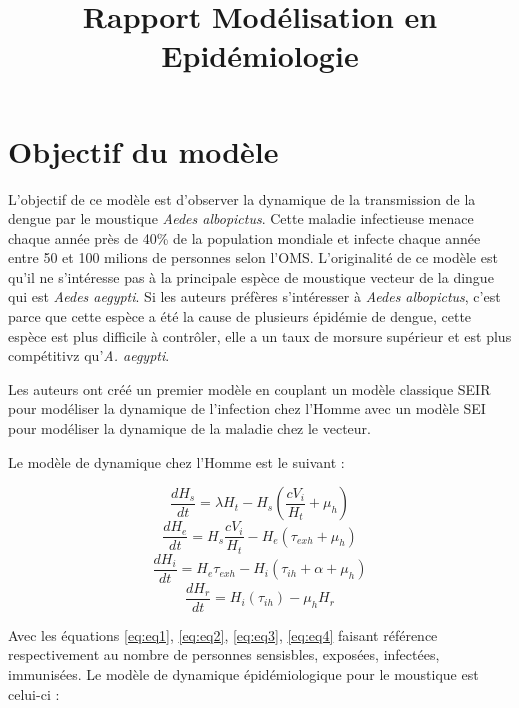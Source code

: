 \documentclass[
  12pt,
  french,
  oneside]{article}
\title{Rapport Modélisation en Epidémiologie}
\date{}
\begin{document}
\maketitle

\hypertarget{objectif-du-moduxe8le}{%
\section{Objectif du modèle}\label{objectif-du-moduxe8le}}

L'objectif de ce modèle est d'observer la dynamique de la transmission
de la dengue par le moustique \emph{Aedes albopictus}. Cette maladie
infectieuse menace chaque année près de 40\% de la population mondiale
et infecte chaque année entre 50 et 100 milions de personnes selon
l'OMS. L'originalité de ce modèle est qu'il ne s'intéresse pas à la
principale espèce de moustique vecteur de la dingue qui est \emph{Aedes
aegypti}. Si les auteurs préfères s'intéresser à \emph{Aedes
albopictus}, c'est parce que cette espèce a été la cause de plusieurs
épidémie de dengue, cette espèce est plus difficile à contrôler, elle a
un taux de morsure supérieur et est plus compétitivz qu'\emph{A.
aegypti}.

Les auteurs ont créé un premier modèle en couplant un modèle classique
SEIR pour modéliser la dynamique de l'infection chez l'Homme avec un
modèle SEI pour modéliser la dynamique de la maladie chez le vecteur.

Le modèle de dynamique chez l'Homme est le suivant :

\begin{equation} \frac{dH_s}{dt} = \lambda H_t - H_s \left(\frac{cV_i}{H_t} + \mu_h\right)\label{eq:eq1}\end{equation}
\begin{equation} \frac{dH_e}{dt} = H_s \frac{cV_i}{H_t} - H_e (\tau_{exh} + \mu_h)\label{eq:eq2}\end{equation}
\begin{equation} \frac{dH_i}{dt} = H_e\tau_{exh} - H_i\left(\tau_{ih} + \alpha + \mu_h\right)\label{eq:eq3}\end{equation}
\begin{equation} \frac{dH_r}{dt} = H_i\left(\tau_{ih}\right) - \mu_h H_r\label{eq:eq4}\end{equation}

Avec les équations \ref{eq:eq1}, \ref{eq:eq2}, \ref{eq:eq3},
\ref{eq:eq4} faisant référence respectivement au nombre de personnes
sensisbles, exposées, infectées, immunisées. Le modèle de dynamique
épidémiologique pour le moustique est celui-ci :
\end{document}
